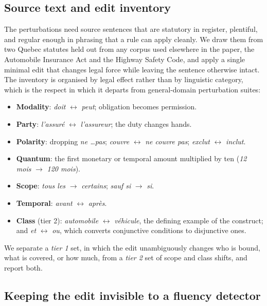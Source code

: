 \documentclass[11pt]{article}
\begin{document}
\subsection{Source text and edit inventory}

The perturbations need source sentences that are statutory in register,
plentiful, and regular enough in phrasing that a rule can apply cleanly. We draw
them from two Quebec statutes held out from any corpus used elsewhere in the
paper, the Automobile Insurance Act and the Highway Safety Code, and apply a
single minimal edit that changes legal force while leaving the sentence
otherwise intact. The inventory is organised by legal effect rather than by
linguistic category, which is the respect in which it departs from general-domain
perturbation suites:

\begin{itemize}\itemsep2pt
\item \textbf{Modality}: \emph{doit} $\leftrightarrow$ \emph{peut}; obligation
      becomes permission.
\item \textbf{Party}: \emph{l'assur\'e} $\leftrightarrow$ \emph{l'assureur};
      the duty changes hands.
\item \textbf{Polarity}: dropping \emph{ne \dots pas}; \emph{couvre}
      $\leftrightarrow$ \emph{ne couvre pas}; \emph{exclut} $\leftrightarrow$
      \emph{inclut}.
\item \textbf{Quantum}: the first monetary or temporal amount multiplied by ten
      (\emph{12 mois} $\rightarrow$ \emph{120 mois}).
\item \textbf{Scope}: \emph{tous les} $\rightarrow$ \emph{certains};
      \emph{sauf si} $\rightarrow$ \emph{si}.
\item \textbf{Temporal}: \emph{avant} $\leftrightarrow$ \emph{apr\`es}.
\item \textbf{Class} (tier 2): \emph{automobile} $\leftrightarrow$
      \emph{v\'ehicule}, the defining example of the construct; and \emph{et}
      $\leftrightarrow$ \emph{ou}, which converts conjunctive conditions to
      disjunctive ones.
\end{itemize}

We separate a \emph{tier 1} set, in which the edit unambiguously changes who is
bound, what is covered, or how much, from a \emph{tier 2} set of scope and class
shifts, and report both.

\subsection{Keeping the edit invisible to a fluency detector}
\end{document}
